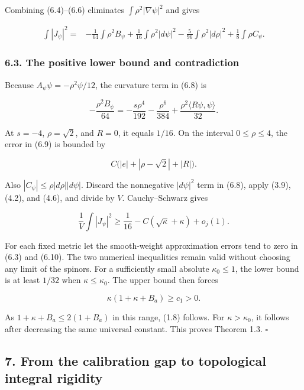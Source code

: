 \documentclass[
  10pt,
]{article}
\begin{document}
Combining (6.4)--(6.6) eliminates \(\int\rho^2|\nabla\psi|^2\) and gives

\[
 \begin{aligned}
 \int|J_\psi|^2={}&-\frac1{64}\int\rho^2 B_\psi
       +\frac1{16}\int\rho^2|d\psi|^2
       -\frac5{96}\int\rho^2|d\rho|^2
       +\frac18\int\rho C_\psi.
 \end{aligned}                                              \tag{6.8}
\]

\hypertarget{the-positive-lower-bound-and-contradiction}{%
\subsubsection{6.3. The positive lower bound and
contradiction}\label{the-positive-lower-bound-and-contradiction}}

Because \(A_\psi\psi=-\rho^2\psi/12\), the curvature term in (6.8) is

\[
 -\frac{\rho^2B_\psi}{64}
        =-\frac{s\rho^4}{192}-\frac{\rho^6}{384}
                                +\frac{\rho^2\langle R\psi,\psi\rangle}{32}.
 \tag{6.9}
\]

At \(s=-4\), \(\rho=\sqrt2\), and \(R=0\), it equals \(1/16\). On the
interval \(0\le\rho\le4\), the error in (6.9) is bounded by

\[
                  C\bigl(|e|+|\rho-\sqrt2|+|R|\bigr).
\]

Also \(|C_\psi|\le\rho|d\rho||d\psi|\). Discard the nonnegative
\(|d\psi|^2\) term in (6.8), apply (3.9), (4.2), and (4.6), and divide
by \(V\). Cauchy--Schwarz gives

\[
 \frac1V\int|J_\psi|^2
                   \ge\frac1{16}-C(\sqrt\kappa+\kappa)+o_j(1).
 \tag{6.10}
\]

For each fixed metric let the smooth-weight approximation errors tend to
zero in (6.3) and (6.10). The two numerical inequalities remain valid
without choosing any limit of the spinors. For a sufficiently small
absolute \(\kappa_0\le1\), the lower bound is at least \(1/32\) when
\(\kappa\le\kappa_0\). The upper bound then forces

\[
                         \kappa(1+\kappa+B_a)\ge c_1>0.
\]

As \(1+\kappa+B_a\le2(1+B_a)\) in this range, (1.8) follows. For
\(\kappa>\kappa_0\), it follows after decreasing the same universal
constant. This proves Theorem 1.3. \(\square\)

\hypertarget{from-the-calibration-gap-to-topological-integral-rigidity}{%
\subsection{7. From the calibration gap to topological integral
rigidity}\label{from-the-calibration-gap-to-topological-integral-rigidity}}
\end{document}
